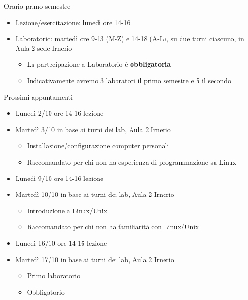 \begin{frame}{Orario primo semestre}
  \begin{itemize}
  \item Lezione/esercitazione: lunedì ore 14-16
  \item Laboratorio: martedì ore 9-13 (M-Z) e 14-18 (A-L), su due
    turni ciascuno, in Aula 2 sede Irnerio
    \begin{itemize}
    \item La partecipazione a Laboratorio è \textbf{obbligatoria}
    \item Indicativamente avremo 3 laboratori il primo semestre e 5 il secondo
    \end{itemize}
  \end{itemize}
\end{frame}

\begin{frame}{Prossimi appuntamenti}
  \begin{itemize}

  \item Lunedì 2/10 ore 14-16 lezione

  \item Martedì 3/10 in base ai turni dei lab, Aula 2 Irnerio
    \begin{itemize}
    \item Installazione/configurazione computer personali
    \item Raccomandato per chi non ha esperienza di programmazione su Linux
    \end{itemize}

  \item Lunedì 9/10 ore 14-16 lezione

  \item Martedì 10/10 in base ai turni dei lab, Aula 2 Irnerio
    \begin{itemize}
    \item Introduzione a Linux/Unix
    \item Raccomandato per chi non ha familiarità con Linux/Unix
    \end{itemize}

  \item Lunedì 16/10 ore 14-16 lezione

  \item Martedì 17/10 in base ai turni dei lab, Aula 2 Irnerio
    \begin{itemize}
    \item Primo laboratorio
    \item Obbligatorio
    \end{itemize}

  \end{itemize}
\end{frame}

